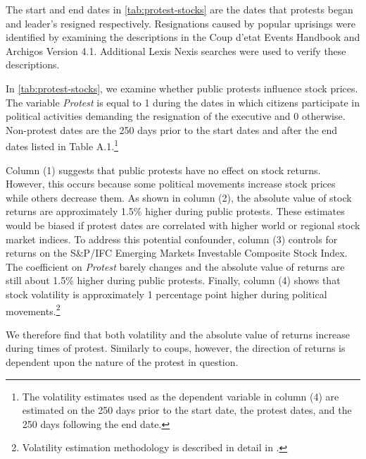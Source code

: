 \documentclass[12pt,final,fleqn]{article}
\theoremstyle{plain}
\begin{document}
The start and end dates in \autoref{tab:protest-stocks} are the dates that protests began and leader's resigned respectively. Resignations caused by popular uprisings were identified by examining the descriptions in the Coup d'etat Events Handbook and Archigos Version 4.1. Additional Lexis Nexis searches were used to verify these descriptions.

In \autoref{tab:protest-stocks}, we examine whether public protests influence stock prices. The variable \textit{Protest} is equal to 1 during the dates in which citizens participate in political activities demanding the resignation of the executive and 0 otherwise. Non-protest dates are the 250 days prior to the start dates and after the end dates listed in Table A.1.\footnote{The volatility estimates used as the dependent variable in column (4) are estimated on the 250 days prior to the start date, the protest dates, and the 250 days following the end date.}

Column (1) suggests that public protests have no effect on stock returns. However, this occurs because some political movements increase stock prices while others decrease them. As shown in column (2), the absolute value of stock returns are approximately 1.5\% higher during public protests. These estimates would be biased if protest dates are correlated with higher world or regional stock market indices. To address this potential confounder, column (3) controls for returns on the S\&P/IFC Emerging Markets Investable Composite Stock Index. The coefficient on \textit{Protest} barely changes and the absolute value of returns are still about 1.5\% higher during public protests. Finally, column (4) shows that stock volatility is approximately 1 percentage point higher during political movements.\footnote{Volatility estimation methodology is described in detail in .}
 

We therefore find that both volatility and the absolute value of returns increase during times of protest. Similarly to coups, however, the direction of returns is dependent upon the nature of the protest in question. 
\end{document}
